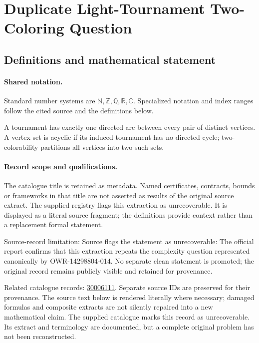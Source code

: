 \documentclass[11pt]{article}
\begin{document}
\section{Duplicate Light-Tournament Two-Coloring Question}\label{statement}

\subsection{Definitions and mathematical statement}

\paragraph{Shared notation.}Standard number systems are $\mathbb N,\mathbb Z,\mathbb Q,\mathbb R,\mathbb C$. Specialized notation and index ranges follow the cited source and the definitions below.


A tournament has exactly one directed arc between every pair of distinct vertices. A vertex set is acyclic if its induced tournament has no directed cycle; two-colorability partitions all vertices into two such sets.
\paragraph{Record scope and qualifications.}
The catalogue title is retained as metadata. Named certificates, contracts, bounds or frameworks in that title are not asserted as results of the original source extract.
The supplied registry flags this extraction as unrecoverable. It is displayed as a literal source fragment; the definitions provide context rather than a replacement formal statement.

Source-record limitation: Source flags the statement as unrecoverable: The official report confirms that this extraction repeats the complexity question represented canonically by OWR-14298804-014. No separate clean statement is promoted; the original record remains publicly visible and retained for provenance.

Related catalogue records: \href{https://mehmetmars7.github.io/Erdosproblems-llm-hunter/problem.html?type=open_problems&id=30006111}{30006111}. Separate source IDs are preserved for their provenance.
The source text below is rendered literally where necessary; damaged formulas and composite extracts are not silently repaired into a new mathematical claim.
The supplied catalogue marks this record as unrecoverable. Its extract and terminology are documented, but a complete original problem has not been reconstructed.
\end{document}
